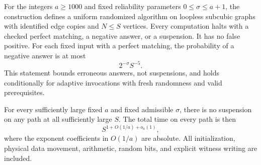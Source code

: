 \begin{theorem}
\label{thm:subcubic}
For the integers \(a\ge1000\) and fixed reliability parameters
\(0\le\sigma\le a+1\), the construction defines a uniform
randomized algorithm on loopless subcubic graphs with
identified edge copies and \(N\le S\) vertices.
Every computation halts with a checked perfect matching,
a negative answer, or a suspension.
It has no false positive.
For each fixed input with a perfect matching, the
probability of a negative answer is at most
\begin{equation}
\label{phase:pm-error}
                            2^{-\sigma}S^{-5}.
\end{equation}
This statement bounds erroneous answers, not suspensions,
and holds conditionally for adaptive invocations with
fresh randomness and valid prerequisites.

For every sufficiently large fixed \(a\) and fixed
admissible \(\sigma\), there is no suspension on any path
at all sufficiently large \(S\).  The total time on every
path is then
\begin{equation}
\label{phase:pm-time}
                              S^{1+O(1/a)+o_a(1)},
\end{equation}
where the exponent coefficients in \(O(1/a)\) are
absolute.  All initialization, physical data movement,
arithmetic, random bits, and explicit witness writing
are included.
\end{theorem}

